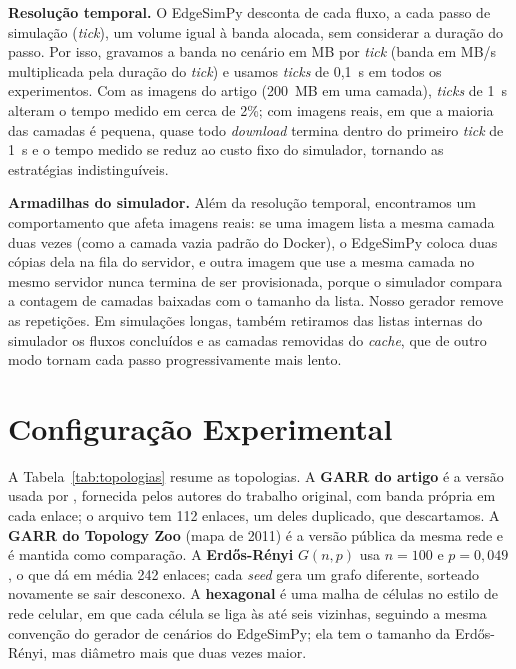 \documentclass[12pt]{article}
\begin{document}
\textbf{Resolução temporal.} O EdgeSimPy desconta de cada fluxo, a cada passo de
simulação (\textit{tick}), um volume igual à banda alocada, sem considerar a
duração do passo. Por isso, gravamos a banda no cenário em MB por \textit{tick}
(banda em MB/s multiplicada pela duração do \textit{tick}) e usamos
\textit{ticks} de 0,1~s em todos os experimentos. Com as imagens do artigo
(200~MB em uma camada), \textit{ticks} de 1~s alteram o tempo medido em cerca de
2\%; com imagens reais, em que a maioria das camadas é pequena, quase todo
\textit{download} termina dentro do primeiro \textit{tick} de 1~s e o tempo medido
se reduz ao custo fixo do simulador, tornando as estratégias indistinguíveis.

\textbf{Armadilhas do simulador.} Além da resolução temporal, encontramos um
comportamento que afeta imagens reais: se uma imagem lista a mesma camada duas
vezes (como a camada vazia padrão do Docker), o EdgeSimPy coloca duas cópias dela
na fila do servidor, e outra imagem que use a mesma camada no mesmo servidor
nunca termina de ser provisionada, porque o simulador compara a contagem de
camadas baixadas com o tamanho da lista. Nosso gerador remove as repetições. Em
simulações longas, também retiramos das listas internas do simulador os fluxos
concluídos e as camadas removidas do \textit{cache}, que de outro modo tornam
cada passo progressivamente mais lento.

\section{Configuração Experimental}
\label{sec:config}

A Tabela~\ref{tab:topologias} resume as topologias. A \textbf{GARR do artigo} é
a versão usada por \cite{knob2021}, fornecida pelos autores do trabalho original,
com banda própria em cada enlace; o arquivo tem 112 enlaces, um deles duplicado,
que descartamos. A \textbf{GARR do Topology Zoo} \cite{knight2011} (mapa de 2011)
é a versão pública da mesma rede e é mantida como comparação.
A \textbf{Erdős-Rényi} $G(n,p)$ usa $n = 100$ e $p = 0{,}049$, o que dá em média
242 enlaces; cada \textit{seed} gera um grafo diferente, sorteado novamente se
sair desconexo. A \textbf{hexagonal} é uma malha de células no estilo de rede
celular, em que cada célula se liga às até seis vizinhas, seguindo a mesma
convenção do gerador de cenários do EdgeSimPy; ela tem o tamanho da Erdős-Rényi,
mas diâmetro mais que duas vezes maior.
\end{document}
